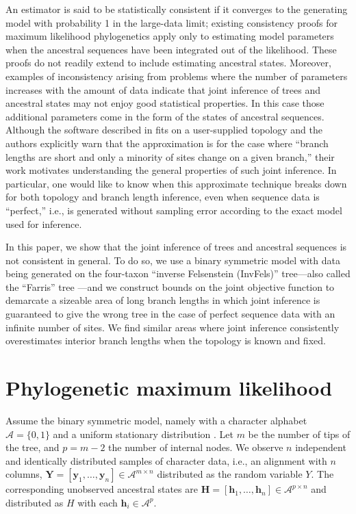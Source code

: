 \documentclass[11pt]{article}
\newcommand{\alphabet}{\mathcal{A}}
\newcommand{\fullAlignment}{\mathbf{Y}}
\newcommand{\alignmentColumn}{\mathbf{y}}
\newcommand{\alignmentColumnRV}{Y}
\newcommand{\fullAncestralStates}{\mathbf{H}}
\newcommand{\ancestralStateColumn}{\mathbf{h}}
\newcommand{\ancestralStateColumnRV}{H}
\newcommand{\nCols}{n}
\newcommand{\nSiteRows}{m}
\newcommand{\nAncestralStateRows}{p}
\begin{document}
An estimator is said to be statistically consistent if it converges to the generating model with probability 1 in the large-data limit; existing consistency proofs for maximum likelihood phylogenetics \citep{RoyChoudhury2015-ta} apply only to estimating model parameters when the ancestral sequences have been integrated out of the likelihood.
These proofs do not readily extend to include estimating ancestral states.
Moreover, examples of inconsistency arising from problems where the number of parameters increases with the amount of data \citep{Neyman1948-tt} indicate that joint inference of trees and ancestral states may not enjoy good statistical properties.
In this case those additional parameters come in the form of the states of ancestral sequences.
Although the software described in \citet{Sagulenko2017-jo} fits on a user-supplied topology and the authors explicitly warn that the approximation is for the case where ``branch lengths are short and only a minority of sites change on a given branch,'' their work motivates understanding the general properties of such joint inference.
In particular, one would like to know when this approximate technique breaks down for both topology and branch length inference, even when sequence data is ``perfect,'' i.e., is generated without sampling error according to the exact model used for inference.

In this paper, we show that the joint inference of trees and ancestral sequences is not consistent in general.
To do so, we use a binary symmetric model with data being generated on the four-taxon ``inverse Felsenstein (InvFels)'' tree---also called the ``Farris'' tree \citep{Siddall1998-hq, Felsenstein2004}---and we construct bounds on the joint objective function to demarcate a sizeable area of long branch lengths in which joint inference is guaranteed to give the wrong tree in the case of perfect sequence data with an infinite number of sites.
We find similar areas where joint inference consistently overestimates interior branch lengths when the topology is known and fixed.

\section*{Phylogenetic maximum likelihood}

Assume the binary symmetric model, namely with a character alphabet $\alphabet=\{0,1\}$ and a uniform stationary distribution \citep{Semple2003-em}.
Let $\nSiteRows$ be the number of tips of the tree, and $\nAncestralStateRows = \nSiteRows-2$ the number of internal nodes.
We observe $\nCols$ independent and identically distributed samples of character data, i.e., an alignment with $\nCols$ columns, $\fullAlignment=[\alignmentColumn_1,\ldots,\alignmentColumn_\nCols]\in\alphabet^{\nSiteRows\times\nCols}$ distributed as the random variable $\alignmentColumnRV$.
The corresponding unobserved ancestral states are $\fullAncestralStates=[\ancestralStateColumn_1,\ldots,\ancestralStateColumn_\nCols]\in\alphabet^{\nAncestralStateRows\times\nCols}$ and distributed as $\ancestralStateColumnRV$ with each $\ancestralStateColumn_i\in\alphabet^\nAncestralStateRows$.
\end{document}
